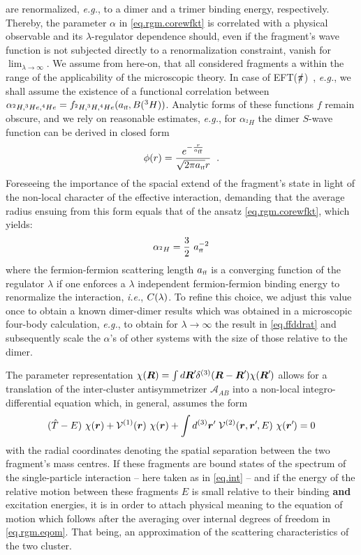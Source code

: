 \documentclass[onecolumn,preprint,superscriptaddress,nofootinbib,notitlepage,10pt,linenumbers]{revtex4-1}
\newcommand*{\mprime}{^{\prime}\mkern-1.2mu}
\newcommand{\eftnopi}{\mbox{EFT($\slashed{\pi}$) }}
\newcommand{\la}{\label}
\newcommand{\be}{\begin{equation}}
\newcommand{\ee}{\end{equation}}
\newcommand{\eg}{\textit{e.g.}\;}
\newcommand{\ie}{\textit{i.e.}\;}
\newcommand{\ve}[1]{\ensuremath{\boldsymbol{#1}}}
\newcommand{\cc}{\ensuremath C(\lambda)}
\newcommand{\aff}{\ensuremath a_{\text{\tiny ff}}}
\begin{document}
are renormalized, \eg, to a dimer and a trimer binding energy, respectively.
Thereby, the parameter $\alpha$ in \eqref{eq.rgm.corewfkt} is correlated with a physical observable and its $\lambda$-regulator
dependence should, even if the fragment's wave function is not subjected directly to a renormalization constraint, vanish
for $\lim_{\lambda\to\infty}$. We assume from here-on, that all considered fragments a within the range of the applicability of the
microscopic theory. In case of \eftnopi, \eg, we shall assume the existence of a functional correlation between
$\alpha_{^2H,^3He,^4He}=f_{^2H,^3H,^4He}(\aff,B(^3H))$. Analytic forms of these functions $f$ remain obscure,
and we rely on reasonable estimates, \eg, for $\alpha_{^2H}$ the dimer $S$-wave function can be derived in closed form
\be
\phi(r)=\frac{e^{-\frac{r}{\aff}}}{\sqrt{2\pi \aff}r}\;\;.
\ee
Foreseeing the importance of the spacial extend of the fragment's state in light of the non-local character of the effective
interaction, demanding that the average radius ensuing from this form equals that of the ansatz \eqref{eq.rgm.corewfkt}, which
yields:
\be
\alpha_{^2H}=\frac{3}{2}\,\,\aff^{-2}
\ee
where the fermion-fermion scattering length $\aff$ is a converging function of the regulator $\lambda$ if one
enforces a $\lambda$ independent fermion-fermion binding energy to renormalize the interaction, \ie, $\cc$.
To refine this choice, we adjust this value once to obtain a known dimer-dimer results which was obtained in a
microscopic four-body calculation, \eg, to obtain for $\lambda\to\infty$ the result in \eqref{eq.ffddrat} and subsequently
scale the $\alpha$'s of other systems with the size of those relative to the dimer.

The parameter representation $\chi(\ve{R})=\int d\ve{R}\mprime\delta^{(3)}(\ve{R}-\ve{R}\mprime)\chi(\ve{R}\mprime)$
allows for a translation of the inter-cluster antisymmetrizer $\mathcal{A}_{AB}$ into a non-local
integro-differential equation which, in general, assumes the form
\be\la{eq.rgm}
(\hat{T}-E)~\chi(\ve{r})+\mathcal{V}^{(1)}(\ve{r})~\chi(\ve{r})+
\int d^{(3)}\ve{r}\mprime~\mathcal{V}^{(2)}(\ve{r},\ve{r}\mprime,E)~\chi(\ve{r}\mprime)=0
\ee
with the radial coordinates denoting the spatial separation between the two fragment's mass centres. If these fragments are
bound states of the spectrum of the single-particle interaction -- here taken as in \eqref{eq.int} -- and if the energy of the relative motion
between these fragments $E$ is small relative to their binding {\bf and} excitation energies, it is in order to attach physical meaning
to the equation of motion which follows after the averaging over internal degrees of freedom in \eqref{eq.rgm.eqom}. That being, an approximation
of the scattering characteristics of the two cluster.
\end{document}
